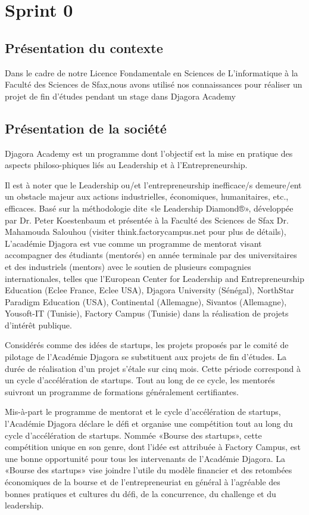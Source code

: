 \section{Sprint 0}
\subsection{Présentation du contexte}
Dans le cadre de notre Licence Fondamentale en Sciences de L'informatique à 
la Faculté des Sciences de Sfax,nous avons utilisé nos connaissances pour 
réaliser un projet de fin d'études pendant un stage dans Djagora Academy 


\subsection{Présentation de la société}
Djagora Academy est un programme dont l’objectif est la mise en pratique des 
aspects  philoso-phiques liés au Leadership et à l’Entrepreneurship.

Il est à noter que le Leadership ou/et l’entrepreneurship inefficace/s demeure/ent un obstacle 
majeur aux actions industrielles, économiques, humanitaires, etc., efficaces. 
Basé sur la méthodologie dite «le Leadership Diamond®», développée par
Dr. Peter Koestenbaum et présentée à la Faculté des Sciences de Sfax Dr. Mahamouda
Salouhou (visiter think.factorycampus.net pour plus de détails), L’académie 
Djagora est vue comme un programme de mentorat visant accompagner des étudiants 
(mentorés) en année terminale par des universitaires et des industriels (mentors) 
avec le soutien de plusieurs compagnies internationales, telles que l’European 
Center for Leadership and Entrepreneurship Education (Eclee France, Eclee USA), 
Djagora University (Sénégal), NorthStar Paradigm Education (USA), Continental 
(Allemagne), Sivantos (Allemagne), Yousoft-IT (Tunisie), Factory Campus (Tunisie)
dans la réalisation de projets d’intérêt publique.

Considérés comme des idées de startups, les projets proposés par
le comité de pilotage de l'Académie Djagora se substituent aux projets de fin
d’études.
La durée de réalisation d’un projet s’étale sur cinq mois. Cette période
correspond à un cycle d’accélération de startups. Tout au long de ce cycle,
les mentorés suivront un programme de formations généralement certifiantes.

Mis-à-part le programme de mentorat et le cycle d’accélération de startups, 
l’Académie Djagora déclare le défi et organise une compétition tout au long
du cycle d’accélération de startups. Nommée «Bourse des startups», cette 
compétition unique en son genre, dont l’idée est attribuée à Factory Campus,
est une bonne opportunité pour tous les intervenants de l’Académie Djagora.
La «Bourse des startups» vise joindre l’utile du modèle financier et des retombées 
économiques de la bourse et de l’entrepreneuriat en général à l’agréable des 
bonnes pratiques et cultures du défi, de la concurrence, du challenge et du 
leadership. 
